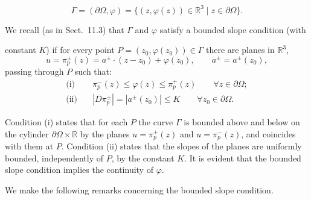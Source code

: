 \[
\Gamma=(\partial\Omega,\varphi)=\{(z,\varphi(z))\in \mathbb{R}^3\mid z\in \partial\Omega\}.
\]

We recall (as in Sect.\ 11.3) that $\Gamma$ and $\varphi$ satisfy a bounded slope condition (with



constant $K$) if for every point $P=(z_0,\varphi(z_0))\in \Gamma$ there are planes in $\mathbb{R}^3$,
\[
u=\pi_p^{\pm}(z)=a^{\pm}\cdot(z-z_0)+\varphi(z_0), \qquad a^{\pm}=a^{\pm}(z_0),
\]
passing through $P$ such that:
\begin{equation}
\begin{aligned}
\text{(i)}\quad &\pi_p^{-}(z)\leq \varphi(z)\leq \pi_p^{+}(z) \qquad \forall z\in \partial\Omega;\\
\text{(ii)}\quad &|D\pi_p^{\pm}|=|a^{\pm}(z_0)|\leq K \qquad \forall z_0\in \partial\Omega.
\end{aligned}
\tag{12.41}
\end{equation}

Condition (i) states that for each $P$ the curve $\Gamma$ is bounded above and below on the
cylinder $\partial\Omega\times \mathbb{R}$ by the planes $u=\pi_p^{+}(z)$ and $u=\pi_p^{-}(z)$, and coincides with them
at $P$. Condition (ii) states that the slopes of the planes are uniformly bounded,
independently of $P$, by the constant $K$. It is evident that the bounded slope condition
implies the continuity of $\varphi$.

We make the following remarks concerning the bounded slope condition.

